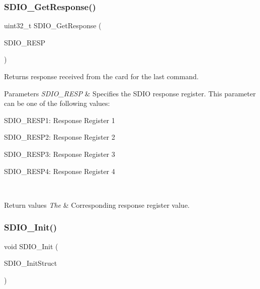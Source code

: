 \subsubsection{\texorpdfstring{SDIO\_GetResponse()}{SDIO\_GetResponse()}}
{\footnotesize\ttfamily uint32\+\_\+t S\+D\+I\+O\+\_\+\+Get\+Response (\begin{DoxyParamCaption}\item[{uint32\+\_\+t}]{S\+D\+I\+O\+\_\+\+R\+E\+SP }\end{DoxyParamCaption})}



Returns response received from the card for the last command. 


\begin{DoxyParams}{Parameters}
{\em S\+D\+I\+O\+\_\+\+R\+E\+SP} & Specifies the S\+D\+IO response register. This parameter can be one of the following values\+: \begin{DoxyItemize}
\item S\+D\+I\+O\+\_\+\+R\+E\+S\+P1\+: Response Register 1 \item S\+D\+I\+O\+\_\+\+R\+E\+S\+P2\+: Response Register 2 \item S\+D\+I\+O\+\_\+\+R\+E\+S\+P3\+: Response Register 3 \item S\+D\+I\+O\+\_\+\+R\+E\+S\+P4\+: Response Register 4 \end{DoxyItemize}
\\
\hline
\end{DoxyParams}

\begin{DoxyRetVals}{Return values}
{\em The} & Corresponding response register value. \\
\hline
\end{DoxyRetVals}
\mbox{\label{group___s_d_i_o___private___functions_gad40764a8e37c0ed5c9141ae338ff0203}} 
\subsubsection{\texorpdfstring{SDIO\_Init()}{SDIO\_Init()}}
{\footnotesize\ttfamily void S\+D\+I\+O\+\_\+\+Init (\begin{DoxyParamCaption}\item[{\mbox{\hyperlink{struct_s_d_i_o___init_type_def}{S\+D\+I\+O\+\_\+\+Init\+Type\+Def}} $\ast$}]{S\+D\+I\+O\+\_\+\+Init\+Struct }\end{DoxyParamCaption})}



